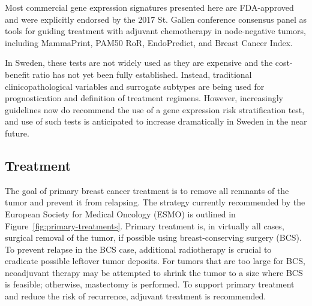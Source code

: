 \documentclass[11pt]{book}
\begin{document}
Most commercial gene expression signatures presented here are FDA-approved and were explicitly endorsed by the 2017 St. Gallen conference consensus panel as tools for guiding treatment with adjuvant chemotherapy in node-negative tumors, including MammaPrint, PAM50 RoR, EndoPredict, and Breast Cancer Index.

In Sweden, these tests are not widely used as they are expensive and the cost-benefit ratio has not yet been fully established. Instead, traditional clinicopathological variables and surrogate subtypes are being used for prognostication and definition of treatment regimens. However, increasingly guidelines now do recommend the use of a gene expression risk stratification test, and use of such tests is anticipated to increase dramatically in Sweden in the near future.


%
%
\subsection{Treatment}
\label{subsec:treatment}

The goal of primary breast cancer treatment is to remove all remnants of the tumor and prevent it from relapsing. The strategy currently recommended by the European Society for Medical Oncology (ESMO) is outlined in Figure~\ref{fig:primary-treatments}. Primary treatment is, in virtually all cases, surgical removal of the tumor, if possible using breast-conserving surgery (BCS). To prevent relapse in the BCS case, additional radiotherapy is crucial to eradicate possible leftover tumor deposits. For tumors that are too large for BCS, neoadjuvant therapy may be attempted to shrink the tumor to a size where BCS is feasible; otherwise, mastectomy is performed. To support primary treatment and reduce the risk of recurrence, adjuvant treatment is recommended.
\end{document}
